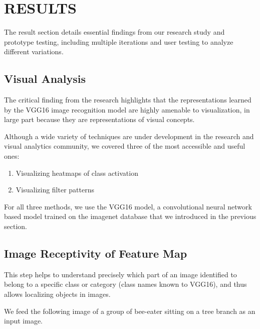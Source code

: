 \chapter{RESULTS}

\graphicspath{ {./results/} }
\thispagestyle{empty}


The result section details essential findings from our research study and prototype testing, including multiple iterations and user testing to analyze different variations.

\section{Visual Analysis}

The critical finding from the research highlights that the representations learned by the VGG16 image recognition model are highly amenable to visualization, in large part because they are representations of visual concepts. 

Although a wide variety of techniques are under development in the research and visual analytics community, we covered three of the most accessible and useful ones:

\begin{enumerate}
\item Visualizing heatmaps of class activation
\item Visualizing filter patterns
\end{enumerate}

For all three methods, we use the VGG16 model, a convolutional neural network based model trained on the imagenet database that we introduced in the previous section.

\section*{Image Receptivity of Feature Map}

This step helps to understand precisely which part of an image identified to belong to a specific class or category (class names known to VGG16), and thus allows localizing objects in images.

We feed the following image of a group of bee-eater sitting on a tree branch as an input image.


